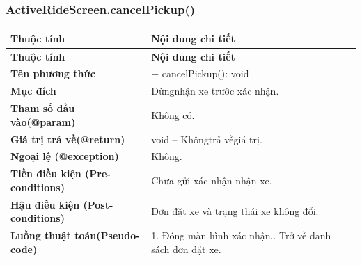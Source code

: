 \subsubsection{ActiveRideScreen.cancelPickup()}
\begin{longtable}{|L{0.24\textwidth}|L{0.70\textwidth}|}
\hline
\textbf{Thuộc tính} & \textbf{Nội dung chi tiết} \\
\hline
\endfirsthead
\hline
\textbf{Thuộc tính} & \textbf{Nội dung chi tiết} \\
\hline
\endhead
\textbf{Tên phương thức} & + cancelPickup(): void \\
\hline
\textbf{Mục đích} & Dừngnhận xe trước xác nhận. \\
\hline
\textbf{Tham số đầu vào}\newline \textbf{(@param)} & Không có. \\
\hline
\textbf{Giá trị trả về(@return)} & void – Khôngtrả vềgiá trị. \\
\hline
\textbf{Ngoại lệ (@exception)} & Không. \\
\hline
\textbf{Tiền điều kiện (Pre-}\newline \textbf{conditions)} & Chưa gửi xác nhận nhận xe. \\
\hline
\textbf{Hậu điều kiện (Post-}\newline \textbf{conditions)} & Đơn đặt xe và trạng thái xe không đổi. \\
\hline
\textbf{Luồng thuật toán}\newline \textbf{(Pseudo-code)} & 1. Đóng màn hình xác nhận.. Trở về danh sách đơn đặt xe. \\
\hline
\end{longtable}
\vspace{-0.5\baselineskip}
